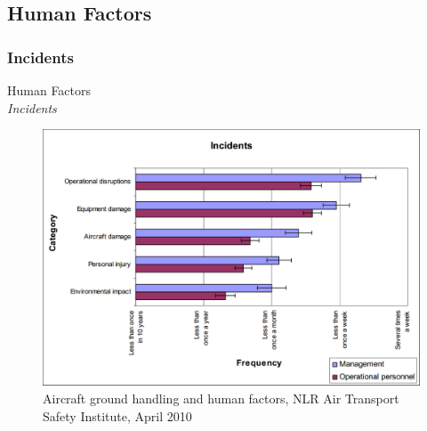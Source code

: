 \subsection{Human Factors}

\subsubsection{Incidents}
\begin{frame}{Human Factors\\\textit{Incidents}}{}
	\begin{figure}[H]
	\centering
	\includegraphics[width=\textwidth]{Grafik/FrequencyOfIncidents}
	\caption{Aircraft ground handling and human factors, NLR Air Transport Safety Institute, April 2010}
\end{figure}
\end{frame}

